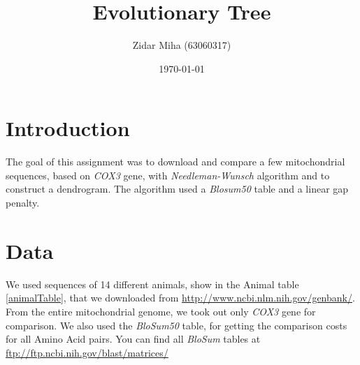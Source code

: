 \documentclass[a4paper,11pt]{article}
\title{Evolutionary Tree}
\author{Zidar Miha (63060317)}
\date{\today}
\begin{document}
\maketitle

\section{Introduction}

The goal of this assignment was to download and compare a few mitochondrial sequences, based on \textit{COX3} gene, with \textit{Needleman-Wunsch} algorithm and to construct a dendrogram. The algorithm used a \textit{Blosum50} table and a linear gap penalty.

\section{Data}

We used sequences of 14 different animals, show in the Animal table \ref{animalTable}, that we downloaded from \url{http://www.ncbi.nlm.nih.gov/genbank/}. From the entire mitochondrial genome, we took out only \textit{COX3} gene for comparison. We also used the \textit{BloSum50} table, for getting the comparison costs for all Amino Acid pairs. You can find all \textit{BloSum} tables at \url{ftp://ftp.ncbi.nih.gov/blast/matrices/}
\end{document}
